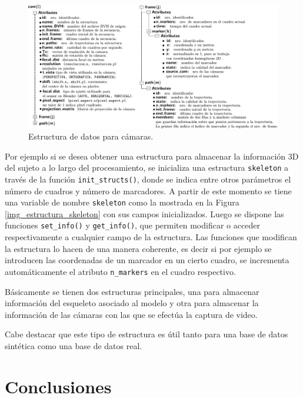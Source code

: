 \begin{figure}[ht!]
   \hspace{-1.2cm}
   \includegraphics[scale=0.6]{img/Base_Datos/Estructura_datos_cam.pdf}
   \caption{Estructura de datos para cámaras.}
   \label{img_estructura_cam}    
 \end{figure} 


Por ejemplo si se desea obtener una estructura para almacenar la información 3D del sujeto a lo largo del procesamiento, se inicializa una estructura \texttt{skeleton} a través de la función \texttt{init\_structs()}, donde se indica entre otros parámetros el número de cuadros y número de marcadores. 
A partir de este momento se tiene una variable de nombre \texttt{skeleton} como la mostrada en la Figura \ref{img_estructura_skeleton} con sus campos inicializados. Luego se dispone las funciones \texttt{set\_info()} y \texttt{get\_info()}, que permiten modificar o acceder respectivamente a cualquier campo de la estructura. Las funciones que modifican la estructura lo hacen de una manera coherente, es decir si por ejemplo se introducen las coordenadas de un marcador en un cierto cuadro, se incrementa automáticamente el atributo \texttt{n\_markers} en el cuadro respectivo.

Básicamente se tienen dos estructuras principales, una para almacenar información del esqueleto asociado al modelo y otra para almacenar la información de las cámaras con las que se efectúa la captura de video.

Cabe destacar que este tipo de estructura es útil tanto para una base de datos sintética como una base de datos real. 





\section{Conclusiones} 

